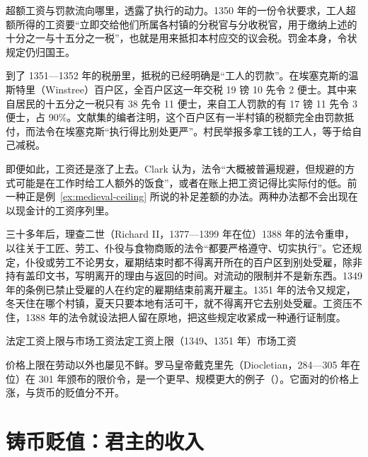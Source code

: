 超额工资与罚款流向哪里，透露了执行的动力。1350 年的一份令状要求，工人超额所得的工资要“立即交给他们所属各村镇的分税官与分收税官，用于缴纳上述的十分之一与十五分之一税”，也就是用来抵扣本村应交的议会税。罚金本身，令状规定仍归国王\cite{bbt1914}。

到了 1351—1352 年的税册里，抵税的已经明确是“工人的罚款”。在埃塞克斯的温斯特里（Winstree）百户区，全百户区这一年交税 19 镑 10 先令 2 便士。其中来自居民的十五分之一税只有 38 先令 11 便士，来自工人罚款的有 17 镑 11 先令 3 便士，占 90\%。文献集的编者注明，这个百户区有一半村镇的税额完全由罚款抵付，而法令在埃塞克斯“执行得比别处更严”\cite{bbt1914}。村民举报多拿工钱的工人，等于给自己减税。

即便如此，工资还是涨了上去。Clark 认为，法令“大概被普遍规避，但规避的方式可能是在工作时给工人额外的饭食”，或者在账上把工资记得比实际付的低\cite{clark1999wp}。前一种正是例~\ref{ex:medieval-ceiling} 所说的补足差额的办法。两种办法都不会出现在以现金计的工资序列里。

三十多年后，理查二世（Richard II，1377—1399 年在位）1388 年的法令重申，以往关于工匠、劳工、仆役与食物商贩的法令“都要严格遵守、切实执行”。它还规定，仆役或劳工不论男女，雇期结束时都不得离开所在的百户区到别处受雇，除非持有盖印文书，写明离开的理由与返回的时间\cite{bbt1914}。对流动的限制并不是新东西。1349 年的条例已禁止受雇的人在约定的雇期结束前离开雇主\cite{bbt1914}。1351 年的法令又规定，冬天住在哪个村镇，夏天只要本地有活可干，就不得离开它去别处受雇\cite{sotr1810}。工资压不住，1388 年的法令就设法把人留在原地，把这些规定收紧成一种通行证制度。

\begin{compare}{法定工资上限与市场工资}{法定工资上限（1349、1351 年）}{市场工资}
\end{compare}

价格上限在劳动以外也屡见不鲜。罗马皇帝戴克里先（Diocletian，284—305 年在位）在 301 年颁布的限价令，是一个更早、规模更大的例子（）。它面对的价格上涨，与货币的贬值分不开。

\section{铸币贬值：君主的收入}\label{sec:medieval-debasement}

